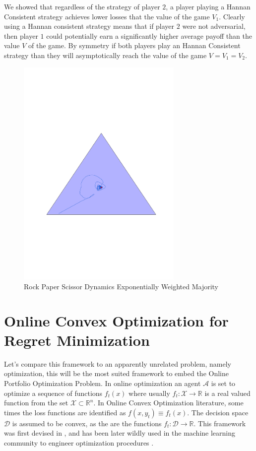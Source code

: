 We showed that regardless of the strategy of player $2$, a player playing a Hannan Consistent strategy achieves lower losses that the value of the game $V_1$. Clearly using a Hannan consistent strategy means that if player $2$ were not adversarial, then player $1$ could potentially earn a significantly higher average payoff than the value $V$ of the game. By symmetry if both players play an Hannan Consistent strategy than they will asymptotically reach the value of the game $V=V_1=V_2$.

\begin{figure}[t!]
    \centering
    \includegraphics[width=8cm]{./img/rps_ewm.pdf}
\caption{Rock Paper Scissor Dynamics Exponentially Weighted Majority}
\label{fig:RPS}
\end{figure}

\section{Online Convex Optimization for Regret Minimization}\label{sec:OCO}

Let's compare this framework to an apparently unrelated problem, namely optimization, this will be the most suited framework to embed the Online Portfolio Optimization Problem. In online optimization an agent $\mathcal A$ is set to optimize a sequence of functions $f_t(x)$ where usually $f_t:\mathcal X\to \mathbb R$ is a real valued function from the set $\mathcal X\subset\mathbb R^n$. In Online Convex Optimization literature, some times the loss functions are identified as $f(x,y_t)\equiv f_t(x)$.
The decision space $\mathcal D$ is assumed to be convex, as the are the functions $f_t:\mathcal D\to \mathbb R$. This framework was first devised in \cite{zinkevich2003online}, and has been later wildly used in the machine learning community to engineer optimization procedures \cite{shalev2012online}. 

